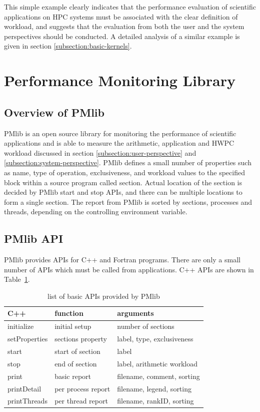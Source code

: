 \documentclass[conference]{IEEEtran}
\begin{document}
This simple example clearly indicates that the performance evaluation of
scientific applications on HPC systems must be associated with the clear
definition of workload, and suggests that the evaluation
from both the user and the system perspectives should be conducted.
A detailed analysis of a similar example is given in section
\ref{subsection:basic-kernels}.

\section{Performance Monitoring Library}
\label{section:PMlib}

\subsection {Overview of PMlib}
PMlib is an open source library for monitoring the performance of scientific
applications and is able to measure the arithmetic, application and HWPC
workload discussed in section
\ref{subsection:user-perspective} and \ref{subsection:system-perspective}.
PMlib defines a small number of properties such as name, type of operation,
exclusiveness, and workload values to the specified
block within a source program called section.
Actual location of the section is decided by PMlib start and stop APIs,
and there can be multiple locations to form a single section.
The report from PMlib is sorted by sections, processes and threads,
depending on the controlling environment variable.

\subsection{PMlib API}
PMlib provides APIs for C++ and Fortran programs.
There are only a small number of APIs which must be called from applications.
C++ APIs are shown in Table~\ref{tab:PMlib-API}. 

\begin{table}[tb]
\small
\caption{list of basic APIs provided by PMlib}
\label{tab:PMlib-API}
\begin{tabular}{l|l|l} \hline
C++	& function	&	arguments	\\ \hline \hline
initialize		& initial setup	& number of sections \\ %
setProperties	& sections property	& label, type, exclusiveness \\ %
start		& start of section	& label \\ %
stop		& end of section	& label, arithmetic workload \\ %
print		& basic report	& filename, comment, sorting	\\ %
printDetail	& per process report	& filename, legend, sorting	\\ %
printThreads	& per thread report	& filename, rankID, sorting	\\ %
\end{tabular}
\end{table}
\end{document}
